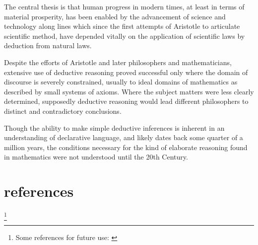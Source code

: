 \documentclass[10pt,titlepage]{book}
\begin{document}
The central thesis is that human progress in modern times, at least in terms of material prosperity, has been enabled by the advancement of science and technology along lines which since the first attempts of Aristotle to articulate scientific method, have depended vitally on the application of scientific laws by deduction from natural laws.

Despite the efforts of Aristotle and later philosophers and mathematicians, extensive use of deductive reasoning proved successful only where the domain of discourse is severely constrained, usually to ideal domains of mathematics as described by small systems of axioms.
Where the subject matters were less clearly determined, supposedly deductive reasoning would lead different philosophers to distinct and contradictory conclusions.

Though the ability to make simple deductive inferences is inherent in an understanding of declarative language, and likely dates back some quarter of a million years, the conditions necessary for the kind of elaborate reasoning found in mathematics were not understood until the 20th Century.




\appendix

\section{references}

\footnote{Some references for future use:
\cite{arthan1991formal}
\cite{beeson2012foundations}
\cite{centrone2019reflections}
\cite{dzamonja2019}
\cite{gettier1963justified}
\cite{jones1992a,jones1992b}
\cite{kline1990mathematical1}
\cite{kline1990mathematical2}
\cite{kline1990mathematical3}
\cite{kumar2016self}
\cite{kuhn2000structure}
\cite{kuhn2012structure}
\cite{oliveira2006unifying}
\cite{shapiro1991foundations}
\cite{shapiroHPML}
\cite{tarski31}
\cite{tarski56}
}

{}


\end{document}
